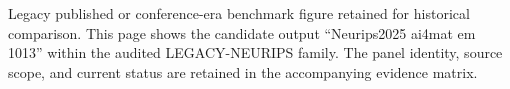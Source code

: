 Legacy published or conference-era benchmark figure retained for historical comparison. This page shows the candidate output ``Neurips2025 ai4mat em 1013'' within the audited LEGACY-NEURIPS family. The panel identity, source scope, and current status are retained in the accompanying evidence matrix.

